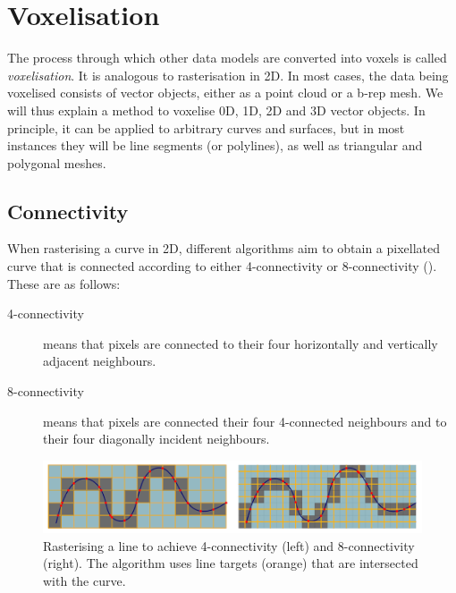 \section{Voxelisation}

The process through which other data models are converted into voxels is called \emph{voxelisation}.
It is analogous to rasterisation in 2D.
In most cases, the data being voxelised consists of vector objects, either as a point cloud or a b-rep mesh.
We will thus explain a method to voxelise 0D, 1D, 2D and 3D vector objects.
In principle, it can be applied to arbitrary curves and surfaces, but in most instances they will be line segments (or polylines), as well as triangular and polygonal meshes.

\subsection{Connectivity}

When rasterising a curve in 2D, different algorithms aim to obtain a pixellated curve that is connected according to either 4-connectivity or 8-connectivity ().
These are as follows:
\begin{description}
\item[4-connectivity] means that pixels are connected to their four horizontally and vertically adjacent neighbours.
\item[8-connectivity] means that pixels are connected their four 4-connected neighbours and to their four diagonally incident neighbours.
\end{description}

\begin{figure}
\centering
\includegraphics[width=\linewidth]{figs/rasterisation}
\caption{Rasterising a line to achieve 4-connectivity (left) and 8-connectivity (right). The algorithm uses line targets (orange) that are intersected with the curve.}%
\label{fig:rasterisation}
\end{figure}

